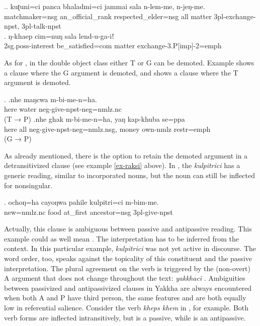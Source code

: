 \ex.\ag. kuʈuni=ci panca bhaladmi=ci jammai sala   n-lem-me, n-jeŋ-me.\\
	matchmaker{\sc =nsg} an\_official\_rank  respected\_elder{\sc =nsg} all matter {\sc 3pl-}exchange{\sc -npst}, {\sc 3pl-}talk{\sc -npst}		\\
	 
\bg. ŋ-khaep cim=nuŋ sala lend-u-ga-iǃ\\
	{\sc 2sg.poss-}interest be\_satisfied{\sc =com} matter exchange{\sc -3.P[imp]-2=emph}\\

As for , in the double object class  either T or  G can be demoted. Example \Next[a] shows a clause where the G argument is demoted, and \Next[b] shows a clause where the T argument is demoted.  

\ex. \ag.nhe maŋcwa m-bi-me-n=ha.\\
here water {\sc neg-}give{\sc [3sg]-npst-neg=nmlz.nc}	\\
 (T → P)
 \bg.nhe ghak m-bi-me-n=ha, yaŋ kap-khuba se=ppa\\
here all {\sc neg-}give{\sc [3sg]-npst-neg=nmlz.nsg}, money own{\sc -nmlz} {\sc restr=emph} \\
 (G → P)


As already mentioned, there is  the option to retain the demoted argument in a  detransitivized clause (see example \ref{ex-raksi} above). In \Next, the  \emph{kulpitrici} has a generic reading, similar to incorporated nouns, but the noun can still be inflected for nonsingular. 

\exg. ochoŋ=ha cayoŋwa  pahile   kulpitri=ci  m-bim-me.\\
new{\sc =nmlz.nc} food at\_first ancestor{\sc =nsg} {\sc 3pl-}give{\sc -npst}\\

Actually, this clause is ambiguous between passive and antipassive reading. This example could as well mean . The interpretation has to be inferred from the context. In this particular example, \emph{kulpitrici} was not yet active in discourse. The word order, too, speaks against the topicality of this constituent and the passive interpretation. The plural agreement on the verb is triggered by the (non-overt) A argument that does not change throughout the text: \emph{yakkhaci} . Ambiguities between passivized and antipassivized clauses in Yakkha are always encountered when both A and P have third person, the same  features and are both equally low in referential salience. Consider the verb \emph{kheps \ti khem}  in \Next, for example. Both verb forms are inflected intransitively, but \Next[a] is a passive, while \Next[b] is an antipassive.

